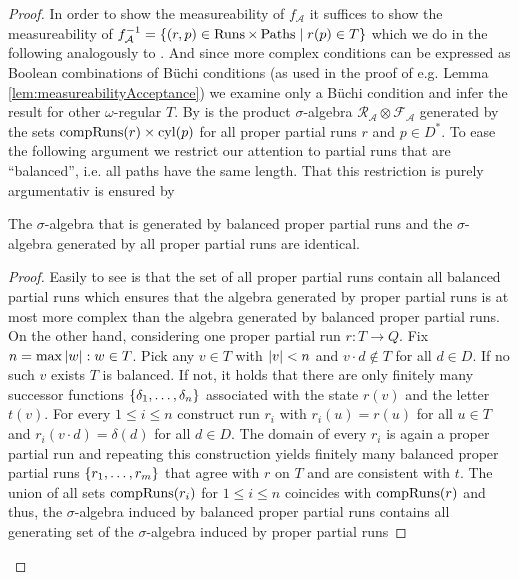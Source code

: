 \begin{proof}
  In order to show the measureability of $f_{\mathcal{A}}$ it suffices to show
  the measureability of $f_{\mathcal{A}}^{-1} =
  \left\{\left(r,p\right)\in\operatorname{Runs}\times\operatorname{Paths}\mid r(p)\in T\right\}$ which we do in the
  following analogously to \cite[Lemma 36]{RandAutoInfTrees}. And since more
  complex conditions can be expressed as Boolean combinations of Büchi
  conditions (as used in the proof of e.g. Lemma
  \ref{lem:measureabilityAcceptance}) we examine only a Büchi condition and
  infer the result for other $\omega$-regular $T$. By
  \cite[Theorem 22.1]{Bauer} is the product $\sigma$-algebra
  $\mathcal{R}_{\mathcal{A}}\otimes\mathcal{F}_{\mathcal{A}}$ generated by the
  sets $\operatorname{compRuns}(r)\times\operatorname{cyl}(p)$ for all proper partial runs $r$ and
  $p\in D^{*}$. To ease the following argument we restrict our attention to
  partial runs that are \enquote{balanced}, i.e. all paths have the same length.
  That this restriction is purely argumentativ is ensured by
  \begin{lemma}
    The $\sigma$-algebra that is generated by balanced proper partial runs and
    the $\sigma$-algebra generated by all proper partial runs are identical.
  \end{lemma}
  \begin{proof}
    Easily to see is that the set of all proper partial runs contain all
    balanced partial runs which ensures that the algebra generated by proper
    partial runs is at most more complex than the algebra generated by balanced
    proper partial runs. On the other hand, considering one proper partial run
    $r:T\rightarrow Q$. Fix $n = \max{\left\vert{w}\right\vert:w\in T}$. Pick any $v\in T$ with
    $\left\vert{v}\right\vert<n$ and $v\cdot d\notin T$ for all $d\in D$. If no such $v$ exists
    $T$ is balanced. If not, it holds that there are only finitely many
    successor functions $\left\{\delta_{1},\dots,\delta_{n}\right\}$ associated with the
    state $r(v)$ and the letter $t(v)$. For every $1\leq i\leq n$ construct run
    $r_{i}$ with $r_{i}(u) = r(u)$ for all $u\in T$ and
    $r_{i}(v\cdot d) = \delta(d)$ for all $d\in D$. The domain of every $r_{i}$
    is again a proper partial run and repeating this construction yields
    finitely many balanced proper partial runs $\left\{r_{1},\dots, r_{m}\right\}$ that
    agree with $r$ on $T$ and are consistent with $t$. The union of all sets
    $\operatorname{compRuns}(r_{i})$ for $1\leq i\leq n$ coincides with $\operatorname{compRuns}(r)$ and
    thus, the $\sigma$-algebra induced by balanced proper partial runs contains
    all generating set of the $\sigma$-algebra induced by proper partial runs

\end{proof}
\end{proof}

